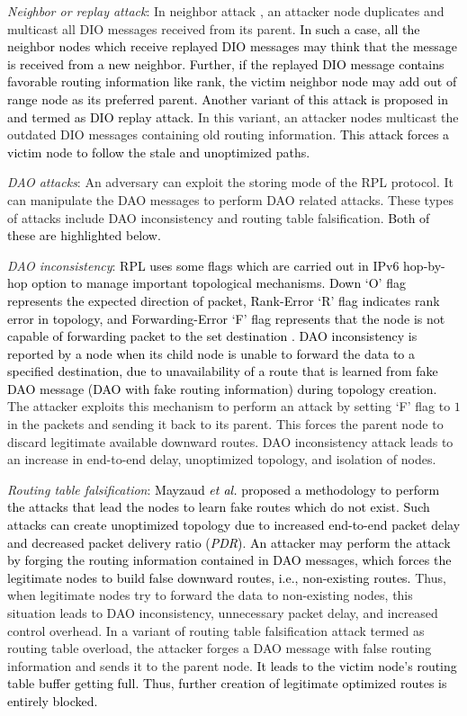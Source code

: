 \documentclass[10pt,journal,sort & compress]{IEEEtran}
\begin{document}
\textit{Neighbor or replay attack}: In neighbor attack \cite{Le2013}, an attacker node duplicates and multicast all DIO messages received from its parent. \textcolor{black}{In such a case, all the neighbor nodes which receive replayed DIO messages may think that the message is received from a new neighbor.} \textcolor{black}{Further, if the replayed DIO message contains favorable routing information like rank, the victim neighbor node may add out of range node as its preferred parent. Another variant of this attack is proposed in \cite{Mayzaud2016Taxanomy} and termed as DIO replay attack.} In this variant, an attacker nodes multicast the outdated DIO messages containing old routing information. \textcolor{black}{This attack forces a victim node to follow the stale and unoptimized paths.}  

\textit{DAO attacks}: An adversary can exploit the storing mode of the RPL protocol. It can manipulate the DAO messages to perform DAO related attacks. These types of attacks include DAO inconsistency and routing table falsification. \textcolor{black}{Both of these are highlighted below.}      

\textit{DAO inconsistency}: \textcolor{black}{RPL uses some flags which are carried out in IPv6 hop-by-hop option to manage important topological mechanisms. Down `O' flag represents the expected direction of packet, Rank-Error `R' flag indicates rank error in topology, and Forwarding-Error `F' flag represents that the node is not capable of forwarding packet to the set destination \cite{winter2012rpl}. DAO inconsistency is reported by a node when its child node is unable to forward the data to a specified destination, due to unavailability of a route that is learned from fake DAO message (DAO with fake routing information) during topology creation.} The attacker exploits this mechanism to perform an attack by setting `F' flag to $ 1 $ in the packets and sending it back to its parent. This forces the parent node to discard legitimate available downward routes. DAO inconsistency attack leads to an increase in end-to-end delay, unoptimized topology, and isolation of nodes.       


\textit{Routing table falsification}: \textcolor{black}{Mayzaud \textit{et al.} \cite{Mayzaud2016Taxanomy} proposed a methodology to perform the attacks that lead the nodes to learn fake routes which do not exist. Such attacks can create unoptimized topology due to increased end-to-end packet delay and decreased packet delivery ratio (\textit{PDR})}. \textcolor{black}{An attacker may perform the attack by forging the routing information contained in DAO messages, which forces the legitimate nodes to build false downward routes, i.e., non-existing routes.} Thus, when legitimate nodes try to forward the data to non-existing nodes, this situation leads to DAO inconsistency, unnecessary packet delay, and increased control overhead. In a variant of routing table falsification attack termed as routing table overload, the attacker forges a DAO message with false routing information and sends it to the parent node. \textcolor{black}{It leads to the victim node's routing table buffer getting full.} \textcolor{black}{Thus, further creation of legitimate optimized routes is entirely blocked.}     
\end{document}
